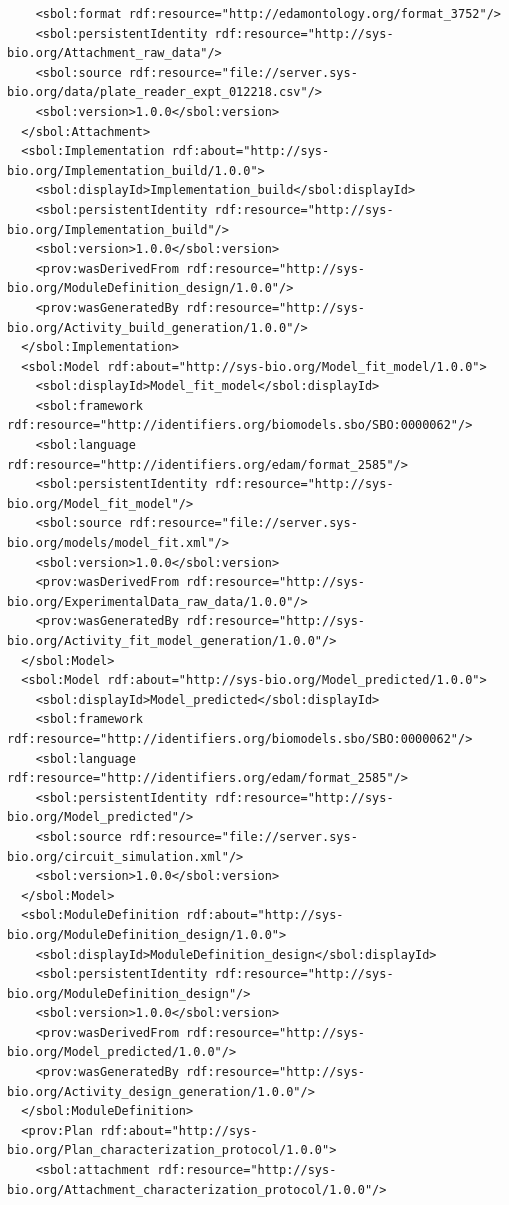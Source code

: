\begin{lstlisting}
    <sbol:format rdf:resource="http://edamontology.org/format_3752"/>
    <sbol:persistentIdentity rdf:resource="http://sys-bio.org/Attachment_raw_data"/>
    <sbol:source rdf:resource="file://server.sys-bio.org/data/plate_reader_expt_012218.csv"/>
    <sbol:version>1.0.0</sbol:version>
  </sbol:Attachment>
  <sbol:Implementation rdf:about="http://sys-bio.org/Implementation_build/1.0.0">
    <sbol:displayId>Implementation_build</sbol:displayId>
    <sbol:persistentIdentity rdf:resource="http://sys-bio.org/Implementation_build"/>
    <sbol:version>1.0.0</sbol:version>
    <prov:wasDerivedFrom rdf:resource="http://sys-bio.org/ModuleDefinition_design/1.0.0"/>
    <prov:wasGeneratedBy rdf:resource="http://sys-bio.org/Activity_build_generation/1.0.0"/>
  </sbol:Implementation>
  <sbol:Model rdf:about="http://sys-bio.org/Model_fit_model/1.0.0">
    <sbol:displayId>Model_fit_model</sbol:displayId>
    <sbol:framework rdf:resource="http://identifiers.org/biomodels.sbo/SBO:0000062"/>
    <sbol:language rdf:resource="http://identifiers.org/edam/format_2585"/>
    <sbol:persistentIdentity rdf:resource="http://sys-bio.org/Model_fit_model"/>
    <sbol:source rdf:resource="file://server.sys-bio.org/models/model_fit.xml"/>
    <sbol:version>1.0.0</sbol:version>
    <prov:wasDerivedFrom rdf:resource="http://sys-bio.org/ExperimentalData_raw_data/1.0.0"/>
    <prov:wasGeneratedBy rdf:resource="http://sys-bio.org/Activity_fit_model_generation/1.0.0"/>
  </sbol:Model>
  <sbol:Model rdf:about="http://sys-bio.org/Model_predicted/1.0.0">
    <sbol:displayId>Model_predicted</sbol:displayId>
    <sbol:framework rdf:resource="http://identifiers.org/biomodels.sbo/SBO:0000062"/>
    <sbol:language rdf:resource="http://identifiers.org/edam/format_2585"/>
    <sbol:persistentIdentity rdf:resource="http://sys-bio.org/Model_predicted"/>
    <sbol:source rdf:resource="file://server.sys-bio.org/circuit_simulation.xml"/>
    <sbol:version>1.0.0</sbol:version>
  </sbol:Model>
  <sbol:ModuleDefinition rdf:about="http://sys-bio.org/ModuleDefinition_design/1.0.0">
    <sbol:displayId>ModuleDefinition_design</sbol:displayId>
    <sbol:persistentIdentity rdf:resource="http://sys-bio.org/ModuleDefinition_design"/>
    <sbol:version>1.0.0</sbol:version>
    <prov:wasDerivedFrom rdf:resource="http://sys-bio.org/Model_predicted/1.0.0"/>
    <prov:wasGeneratedBy rdf:resource="http://sys-bio.org/Activity_design_generation/1.0.0"/>
  </sbol:ModuleDefinition>
  <prov:Plan rdf:about="http://sys-bio.org/Plan_characterization_protocol/1.0.0">
    <sbol:attachment rdf:resource="http://sys-bio.org/Attachment_characterization_protocol/1.0.0"/>

\end{lstlisting}
